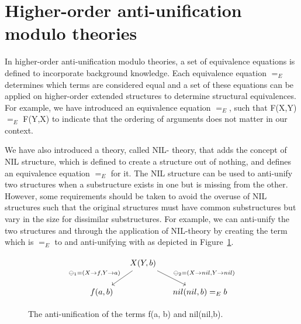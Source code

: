 \section{Higher-order anti-unification modulo theories}   \label{HOAUMT}
In higher-order anti-unification modulo theories, a set of equivalence equations is defined to incorporate background knowledge. Each equivalence equation $=_E$ determines which terms are considered equal and a set of these equations can be applied on higher-order extended structures to determine structural equivalences. For example, we have introduced an equivalence equation $=_E$, such that F(X,Y) $=_E$ F(Y,X) to indicate that the ordering of arguments does not matter in our context.

We have also introduced a theory, called NIL- theory, that adds the concept of NIL structure, which is defined to create a structure out of nothing, and defines an equivalence equation $=_E$ for it. The NIL structure can be used to anti-unify two structures when a substructure exists in one but is missing from the other. However, some requirements should be taken to avoid the overuse of NIL structures such that the original structures must have common substructures but vary in the size for dissimilar substructures. For example, we can anti-unify the two structures  and  through the application of NIL-theory by creating the term  which is $=_E$ to  and anti-unifying  with  as depicted in Figure~\ref{fig:anti-nil}.
\begin{figure} [H]
\[
\begin{tikzcd}[column sep=small] 
&  
  X(Y,b)
  \arrow{dr}{\ominus_2 = ( X \rightarrow nil, Y \rightarrow nil) }
  \arrow[->,swap]{dl}{\ominus_1 = ( X \rightarrow f, Y \rightarrow a)} %
\\
f(a,b)
&&
nil(nil,b) =_E  b 
\end{tikzcd}
\]
  \caption{ The anti-unification of the terms f(a, b) and nil(nil,b).}
  \label{fig:anti-nil}
\end{figure}


